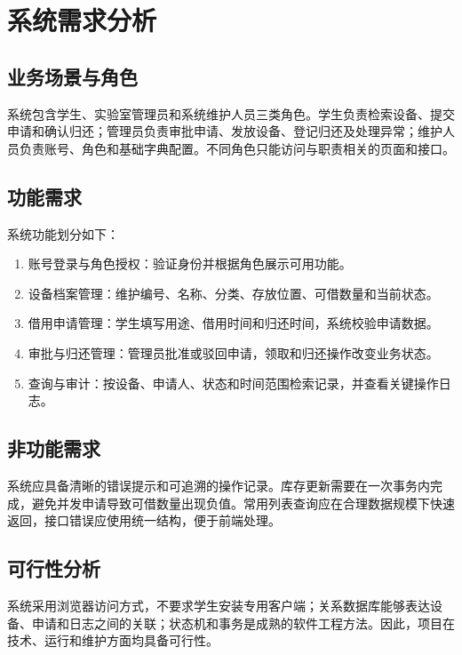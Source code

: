 \chapter{系统需求分析}
\section{业务场景与角色}
系统包含学生、实验室管理员和系统维护人员三类角色。学生负责检索设备、提交申请和确认归还；管理员负责审批申请、发放设备、登记归还及处理异常；维护人员负责账号、角色和基础字典配置。不同角色只能访问与职责相关的页面和接口。
\section{功能需求}
系统功能划分如下：
\begin{enumerate}
\item 账号登录与角色授权：验证身份并根据角色展示可用功能。
\item 设备档案管理：维护编号、名称、分类、存放位置、可借数量和当前状态。
\item 借用申请管理：学生填写用途、借用时间和归还时间，系统校验申请数据。
\item 审批与归还管理：管理员批准或驳回申请，领取和归还操作改变业务状态。
\item 查询与审计：按设备、申请人、状态和时间范围检索记录，并查看关键操作日志。
\end{enumerate}
\section{非功能需求}
系统应具备清晰的错误提示和可追溯的操作记录。库存更新需要在一次事务内完成，避免并发申请导致可借数量出现负值。常用列表查询应在合理数据规模下快速返回，接口错误应使用统一结构，便于前端处理。
\section{可行性分析}
系统采用浏览器访问方式，不要求学生安装专用客户端；关系数据库能够表达设备、申请和日志之间的关联；状态机和事务是成熟的软件工程方法。因此，项目在技术、运行和维护方面均具备可行性。
